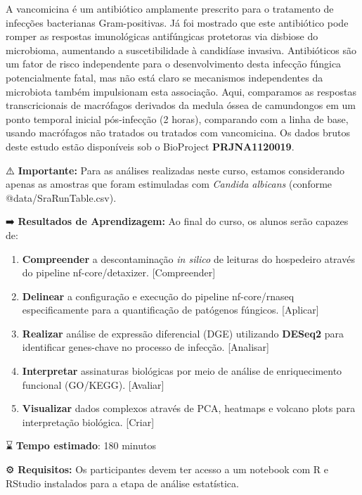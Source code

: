 \documentclass[
  letterpaper,
  DIV=11,
  numbers=noendperiod]{scrreprt}
\providecommand{\tightlist}{%
  \setlength{\itemsep}{0pt}\setlength{\parskip}{0pt}}
\begin{document}
A vancomicina é um antibiótico amplamente prescrito para o tratamento de
infecções bacterianas Gram-positivas. Já foi mostrado que este
antibiótico pode romper as respostas imunológicas antifúngicas
protetoras via disbiose do microbioma, aumentando a suscetibilidade à
candidíase invasiva. Antibióticos são um fator de risco independente
para o desenvolvimento desta infecção fúngica potencialmente fatal, mas
não está claro se mecanismos independentes da microbiota também
impulsionam esta associação. Aqui, comparamos as respostas
transcricionais de macrófagos derivados da medula óssea de camundongos
em um ponto temporal inicial pós-infecção (2 horas), comparando com a
linha de base, usando macrófagos não tratados ou tratados com
vancomicina. Os dados brutos deste estudo estão disponíveis sob o
BioProject \textbf{PRJNA1120019}.

⚠️ \textbf{Importante:} Para as análises realizadas neste curso, estamos
considerando apenas as amostras que foram estimuladas com \emph{Candida
albicans} (conforme @data/SraRunTable.csv).

➡️ \textbf{Resultados de Aprendizagem:} Ao final do curso, os alunos
serão capazes de:

\begin{enumerate}
\def\labelenumi{\arabic{enumi}.}
\tightlist
\item
  \textbf{Compreender} a descontaminação \emph{in silico} de leituras do
  hospedeiro através do pipeline nf-core/detaxizer. {[}Compreender{]}
\item
  \textbf{Delinear} a configuração e execução do pipeline nf-core/rnaseq
  especificamente para a quantificação de patógenos fúngicos.
  {[}Aplicar{]}
\item
  \textbf{Realizar} análise de expressão diferencial (DGE) utilizando
  \textbf{DESeq2} para identificar genes-chave no processo de infecção.
  {[}Analisar{]}
\item
  \textbf{Interpretar} assinaturas biológicas por meio de análise de
  enriquecimento funcional (GO/KEGG). {[}Avaliar{]}
\item
  \textbf{Visualizar} dados complexos através de PCA, heatmaps e volcano
  plots para interpretação biológica. {[}Criar{]}
\end{enumerate}

⌛ \textbf{Tempo estimado}: 180 minutos

⚙️ \textbf{Requisitos:} Os participantes devem ter acesso a um notebook
com R e RStudio instalados para a etapa de análise estatística.
\end{document}
